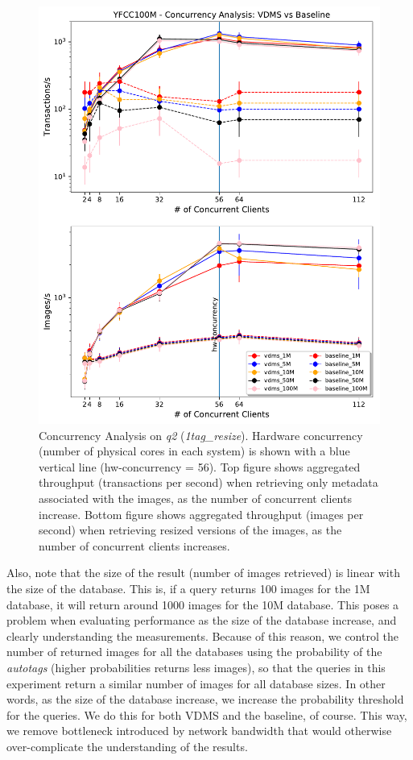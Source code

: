 \begin{figure}[ht]
\includegraphics[width=\columnwidth]{figures/concurrency_comparison}
\caption{Concurrency Analysis on \textit{q2} (\textit{1tag\_resize}).
Hardware concurrency (number of physical cores in each system)
is shown with a blue vertical line (hw-concurrency = 56).
Top figure shows aggregated throughput (transactions per second)
when retrieving only metadata associated with the images, as the number of
concurrent clients increase.
Bottom figure shows aggregated throughput (images per second) when retrieving
resized versions of the images, as the number of concurrent clients increases.}
\label{fig:concurrency_comparison}
\end{figure}

Also, note that the size of the result (number of images retrieved)
is linear with the size of the database. This is, if a query returns 100 images
for the 1M database, it will return around 1000 images for the 10M database.
This poses a problem when evaluating performance as the size of the database increase,
and clearly understanding the measurements.
Because of this reason, we control the number of returned images for all the
databases using the probability of the \textit{autotags} 
(higher probabilities returns less images), so that the queries in 
this experiment return a similar number of images for all database sizes.
In other words, as the size of the database increase, we increase the probability
threshold for the queries. We do this for both VDMS and the baseline, of course.
This way, we remove bottleneck introduced by network bandwidth that would
otherwise over-complicate the understanding of the results.

